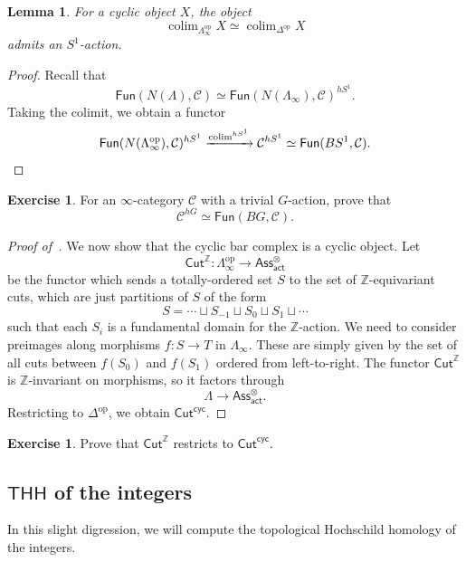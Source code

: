 \documentclass[10pt, oneside]{memoir}
\newtheorem{lem}[thm]{Lemma}
\theoremstyle{definition}
\newtheorem{exer}[thm]{Exercise}
\theoremstyle{remark}
\theoremstyle{plain}
\theoremstyle{definition}
\theoremstyle{remark}
\newcommand{\Z}{\mathbb{Z}}
\newcommand{\mc}[1]{\mathcal{#1}}
\newcommand{\ms}[1]{\mathsf{#1}}
\newcommand{\1}{\mathbf{1}}
\newcommand{\2}{\mathbf{2}}
\newcommand{\3}{\mathbf{3}}
\newcommand{\THH}{\ms{THH}}
\DeclareMathOperator{\op}{op}
\DeclareMathOperator*{\colim}{colim}
\begin{document}
\begin{lem}
    For a cyclic object \(X \), the object
    \[ \colim_{\Lambda_{\infty}^{\op}} X \simeq \colim_{\Delta^{\op}} X \]
    admits an \(S^1 \)-action.
\end{lem}

\begin{proof}
    Recall that
    \[ \ms{Fun}(N(\Lambda), \mc{C}) \simeq \ms{Fun}(N(\Lambda_{\infty}), \mc{C})^{hS^1}. \]
    Taking the colimit, we obtain a functor
    \[ \ms{Fun}(N(\Lambda_{\infty}^{\op}), \mc{C})^{h S^1} \xrightarrow{\colim^{hS^1}} \mc{C}^{hS^1} \simeq \ms{Fun}(BS^1, \mc{C}). \qedhere \]
\end{proof}

\begin{exer}
    For an \(\infty \)-category \(\mc{C} \) with a trivial \(G \)-action, prove that
    \[ \mc{C}^{hG} \simeq \ms{Fun}(BG, \mc{C}). \]
\end{exer}


\begin{proof}[Proof of~]
    We now show that the cyclic bar complex is a cyclic object. Let
    \[ \ms{Cut}^{\Z} \colon \Lambda^{\op}_{\infty} \to \ms{Ass}_{\ms{act}}^{\otimes} \]
    be the functor which sends a totally-ordered set \(S \) to the set of \(\Z \)-equivariant cuts, which are just partitions of \(S \) of the form
    \[ S = \cdots \sqcup S_{-1} \sqcup S_0 \sqcup S_1 \sqcup \cdots \]
    such that each \(S_i \) is a fundamental domain for the \(\Z \)-action. We need to consider preimages along morphisms \(f \colon S \to T \) in \(\Lambda_{\infty} \). These are simply given by the set of all cuts between \(f(S_0) \) and \(f(S_1) \) ordered from left-to-right. The functor \(\ms{Cut}^{\Z} \) is \(\Z \)-invariant on morphisms, so it factors through
    \[ \Lambda \to \ms{Ass}_{\ms{act}}^{\otimes}. \]
    Restricting to \(\Delta^{\op} \), we obtain \(\ms{Cut}^{\ms{cyc}} \).
\end{proof}

\begin{exer}
    Prove that \(\ms{Cut}^{\Z} \) restricts to \(\ms{Cut}^{\ms{cyc}} \).
\end{exer}


\subsection{\(\THH \) of the integers}%
\label{sub:THH of the integers}

In this slight digression, we will compute the topological Hochschild homology of the integers.
\end{document}
